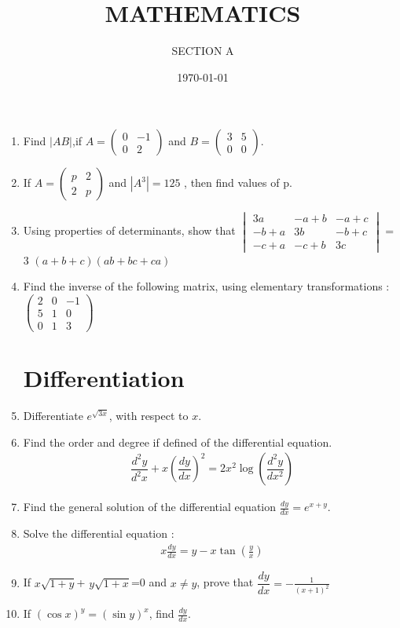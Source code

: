 \documentclass[2pt,-letter paper]{article}
\title{MATHEMATICS}
\author{SECTION A}
\date{\today}
\providecommand{\brak}[1]{\ensuremath{\left(#1\right)}}
\newcommand{\myvec}[1]{\ensuremath{\begin{pmatrix}#1\end{pmatrix}}}
\begin{document}
\maketitle

\begin{enumerate}
\section{Matrix}
\item Find $|AB|$,if $A = \myvec{0 & -1 \\ 0 & 2}$ and $B = \myvec{3 & 5 \\ 0 & 0}$.
\item If $A = \myvec{p & 2 \\ 2 & p}$ and $|A^3| = 125$
, then find values of p.
\item Using properties of determinants, show that      $\begin{vmatrix}                                   
3a & -a + b & -a + c \\ -b + a & 3b & -b + c \\-c + a & -c + b & 3c\end{vmatrix}$ = 3 \brak{a + b + c}\brak{ab + bc + ca}
\item Find the inverse of the following matrix, using elementary transformations : $\myvec{2 & 0 & -1 \\ 5 & 1& 0 \\ 0 & 1 & 3}$
\section{Differentiation}
\item Differentiate $e^{\sqrt{3x}}$, with respect to ${x}$.
\item Find the order and degree if defined of the differential equation. 
\begin{align*}
 \dfrac{d^2y}{d^2x}+x\brak{\dfrac{dy}{dx}}^2=2x^2\log\brak{\dfrac{d^2y}{dx^2}}
\end{align*}
\item Find the general solution of the differential equation $\frac{dy}{dx} = e^{x+y}$.
\item Solve the differential equation :                \begin{align*}  x\frac{dy}{dx} = y - x\tan{\brak{\frac{y}{x}}}  \end{align*}
\item If $x\sqrt{1+y}$+ $y\sqrt{1+x}$=0 and $x\neq y$,   prove that $\dfrac{dy}{dx} = -\frac{1}{\brak{x+1}^2}$
\item If $\brak{\cos x}^y = \brak{\sin y}^x$, find $\frac{dy}{dx}$.

\end{enumerate}
\end{document}
